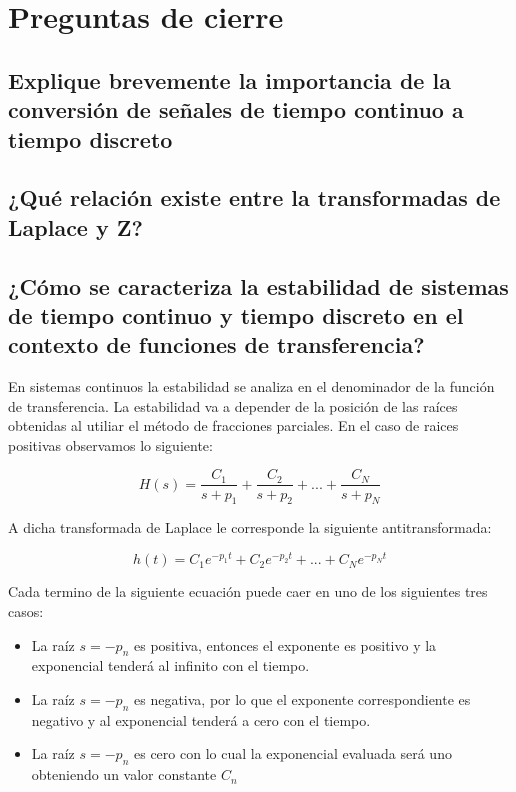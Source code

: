 \section{Preguntas de cierre}

\subsection{Explique brevemente la importancia de la conversión de señales de tiempo continuo a tiempo discreto}

\subsection{¿Qué relación existe entre la transformadas de Laplace y Z?}

\subsection{¿Cómo se caracteriza la estabilidad de sistemas de tiempo continuo y tiempo discreto en el contexto de funciones de transferencia?}

En sistemas continuos la estabilidad se analiza en el denominador de la función de transferencia. La estabilidad va a depender de la posición de las raíces obtenidas al utiliar el método de fracciones parciales. En el caso de raices positivas observamos lo siguiente:

\begin{equation}
H(s)=\frac{C_1}{s+p_1}+\frac{C_2}{s+p_2}+...+\frac{C_N}{s+p_N}
\end{equation}

A dicha transformada de Laplace le corresponde la siguiente antitransformada:

\begin{equation}
h(t)=C_1e^{-p_1t}+C_2e^{-p_2t}+...+C_Ne^{-p_Nt}
\end{equation}

Cada termino de la siguiente ecuación puede caer en uno de los siguientes tres casos:

\begin{itemize}
\item La raíz $s=-p_n$ es positiva, entonces el exponente es positivo y la exponencial tenderá al infinito con el tiempo.
\item La raíz $s=-p_n$ es negativa, por lo que el exponente correspondiente es negativo y al exponencial tenderá a cero con el tiempo.
\item La raíz $s=-p_n$ es cero con lo cual la exponencial evaluada será uno obteniendo un valor constante $C_n$
\end{itemize}

